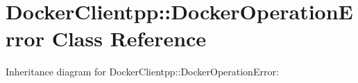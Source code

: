 \hypertarget{classDockerClientpp_1_1DockerOperationError}{}\section{Docker\+Clientpp\+::Docker\+Operation\+Error Class Reference}
\label{classDockerClientpp_1_1DockerOperationError}


Inheritance diagram for Docker\+Clientpp\+::Docker\+Operation\+Error\+:
